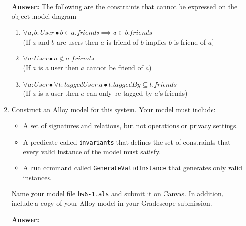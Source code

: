 \begin{enumerate}
        \textbf {Answer:} The following are the constraints that cannot be expressed on the object model diagram
            \begin {enumerate}
                \item $ \forall a, b: User \bullet b \in a.friends \implies a \in b.friends $\\
(If $a$ and $b$ are users then $a$ is friend of $b$ implies $b$ is friend of $a$)
                \item $ \forall a : User \bullet a \notin a.friends $\\
                    (If $a$ is a user then $a$ cannot be friend of $a$)
                \item $ \forall a : User \bullet \forall t : taggedUser.a \bullet t.taggedBy \subseteq t.friends $ \\
                    (If $a$ is a user then $a$ can only be tagged by $a$’s friends)
            \end {enumerate}
	\item Construct an Alloy model for this system. Your model must
	      include:
	      \begin{itemize}
		      \item A set of signatures and relations, but not operations or
		            privacy settings.
		      \item A predicate called \texttt{invariants} that defines the
		            set of constraints that every valid instance of the model must satisfy.
		      \item A \texttt{run} command called \texttt{GenerateValidInstance} that generates only valid instances.
	      \end{itemize}
	      Name your model file \texttt{hw6-1.als}  and submit it on
	      Canvas. In addition, include a copy of your Alloy model in your
	      Gradescope submission. 

          \smallskip \textbf{Answer:} 
          \begin{alloy}

          \end{alloy}
\end{enumerate}
